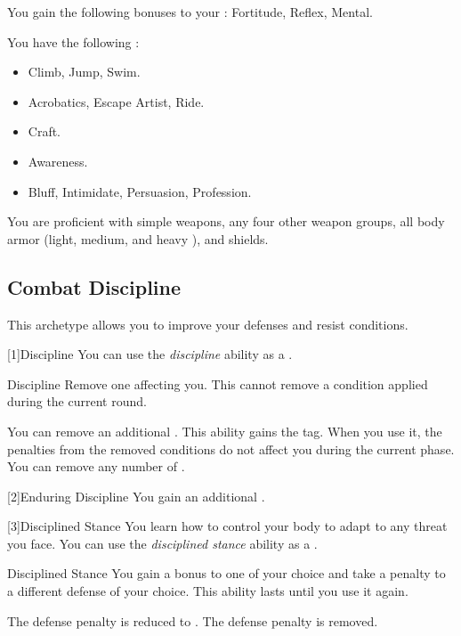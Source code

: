         You gain the following bonuses to your :  Fortitude,  Reflex,  Mental.

        You have the following :
        \begin{itemize}
            \item {} Climb, Jump, Swim.
            \item {} Acrobatics, Escape Artist, Ride.
            \item {} Craft.
            \item {} Awareness.
            \item {} Bluff, Intimidate, Persuasion, Profession.
        \end{itemize}

        You are proficient with simple weapons, any four other weapon groups, all body armor (light, medium, and heavy ), and shields.

    \subsection{Combat Discipline}
        This archetype allows you to improve your defenses and resist conditions.

        [1]{Discipline} You can use the \textit{discipline} ability as a .
        \begin{freeability}{Discipline}
            Remove one  affecting you.
            This cannot remove a condition applied during the current round.

            \rankline
             You can remove an additional .
             This ability gains the  tag.
            When you use it, the penalties from the removed conditions do not affect you during the current phase.
             You can remove any number of .
        \end{freeability}

        [2]{Enduring Discipline}
        You gain an additional .

        [3]{Disciplined Stance}
        You learn how to control your body to adapt to any threat you face.
        You can use the \textit{disciplined stance} ability as a .
        \begin{freeability}{Disciplined Stance}
            You gain a  bonus to one  of your choice and take a  penalty to a different defense of your choice.
            This ability lasts until you use it again.

            \rankline
             The defense penalty is reduced to .
             The defense penalty is removed.
        \end{freeability}

